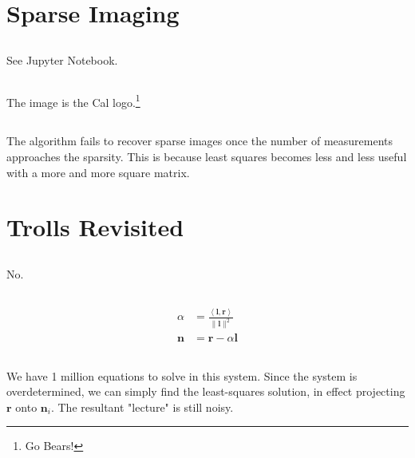 \documentclass[]{article}
\newcommand{\iprod}[2]{\left\langle #1, #2 \right\rangle}
\begin{document}
\section{Sparse Imaging}

\subsection{}

See Jupyter Notebook. 

\subsection{}

The image is the Cal logo.\footnote{Go Bears!}

\subsection{}

The algorithm fails to recover sparse images once the number of measurements approaches the sparsity. 
This is because least squares becomes less and less useful with a more and more square matrix. 

\section{Trolls Revisited}

\subsection{}

No. 

\subsection{}

\begin{align}
	\alpha &= \frac{\iprod{\bm{l}}{\bm{r}}}{\|\bm{l}\|^2} \\
	\bm{n} &= \bm{r} - \alpha \bm{l}
\end{align}

\subsection{}

We have 1 million equations to solve in this system. 
Since the system is overdetermined, we can simply find the least-squares solution, in effect projecting \(\bm{r}\) onto \(\bm{n}_i\). 
The resultant "lecture" is still noisy. 
\end{document}
